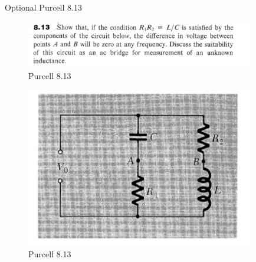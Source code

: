 \documentclass[makesolutionspdf]{esg8022pset}
\begin{document}
\begin{problem}{ Optional Purcell 8.13}

\begin{figure}[H]
    \centering
    \includegraphics[width = 10cm]{pu813}
    \caption{Purcell 8.13}
  \end{figure}
  
  \begin{figure}[H]
    \centering
    \includegraphics[width = 10cm]{figpu813}
    \caption{Purcell 8.13}
  \end{figure}

\end{problem}
\end{document}
